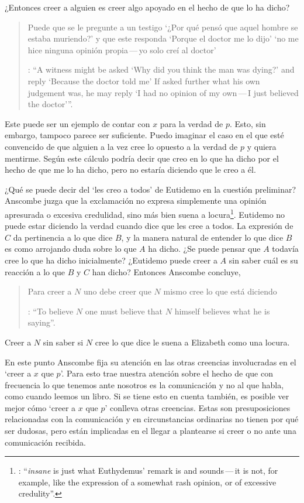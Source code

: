 ¿Entonces creer a alguien es creer algo apoyado en el hecho de que lo ha dicho? \blockquote[{\Cite[4]{anscombe2008faith:tobelieve}}: \enquote{A witness might be asked `Why did you think the man was dying?' and reply `Because the doctor told me' \textelp{} If asked further what his own judgement was, he may reply `I had no opinion of my own\,---\,I just believed the doctor'}.]{Puede que se le pregunte a un testigo `¿Por qué pensó que aquel hombre se estaba muriendo?' y que este responda `Porque el doctor me lo dijo' \textelp{} `no me hice ninguna opinión propia\,---\,yo solo creí al doctor'}. Este puede ser un ejemplo de contar con $x$ para la verdad de $p$. Esto, sin embargo, tampoco parece ser suficiente. Puedo imaginar el caso en el que esté convencido de que alguien a la vez cree lo opuesto a la verdad de $p$ y quiera mentirme. Según este cálculo podría decir que creo en lo que ha dicho por el hecho de que me lo ha dicho, pero no estaría diciendo que le creo a él.

¿Qué se puede decir del \enquote*{les creo a todos} de Eutidemo en la cuestión preliminar? Anscombe juzga que la exclamación no expresa simplemente una opinión apresurada o excesiva credulidad, sino más bien suena a locura\footnote{\cite[Cf.][5]{anscombe2008faith:tobelieve}: \enquote{\emph{insane} is just what Euthydemus' remark is and sounds\,---\,it is not, for example, like the expression of a somewhat rash opinion, or of excessive credulity}.}. Eutidemo no puede estar diciendo la verdad cuando dice que les cree a todos. La expresión de $C$ da pertinencia a lo que dice $B$, y la manera natural de entender lo que dice $B$ es como arrojando duda sobre lo que $A$ ha dicho. ¿Se puede pensar que $A$ todavía cree lo que ha dicho inicialmente? ¿Eutidemo puede creer a $A$ sin saber cuál es su reacción a lo que $B$ y $C$ han dicho? Entonces Anscombe concluye, \blockquote[{\Cite[5]{anscombe2008faith:tobelieve}}: \enquote{To believe $N$ one must believe that $N$ himself believes what he is saying}.]{Para creer a $N$ uno debe creer que $N$ mismo cree lo que está diciendo}. Creer a $N$ sin saber si $N$ cree lo que dice le suena a Elizabeth como una locura.

En este punto Anscombe fija su atención en las otras creencias involucradas en el `creer a $x$ que $p$'. Para esto trae nuestra atención sobre el hecho de que con frecuencia lo que tenemos ante nosotros es la comunicación y no al que habla, como cuando leemos un libro. Si se tiene esto en cuenta también, es posible ver mejor cómo `creer a $x$ que $p$' conlleva otras creencias. Estas son presuposiciones relacionadas con la comunicación y en circunstancias ordinarias no tienen por qué ser dudosas, pero están implicadas en el llegar a plantearse si creer o no ante una comunicación recibida.

